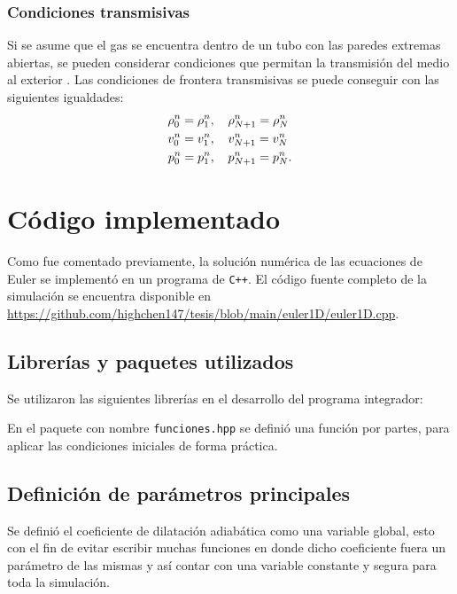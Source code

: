 \subsubsection{Condiciones transmisivas}
Si se asume que el gas se encuentra dentro de un tubo con las paredes extremas abiertas, se pueden considerar condiciones que permitan la transmisión del medio al exterior \cite{thesis-euler-godunov}. Las condiciones de frontera transmisivas se puede conseguir con las siguientes igualdades:
\begin{align}
	\rho_{0}^{n} = \rho_{1}^{n}, \hspace{4mm}&
	\rho_{N+1}^{n} = \rho_{N}^{n} \\
	v_{0}^{n} = v_{1}^{n}, \hspace{4mm}&
	v_{N+1}^{n} = v_{N}^{n} \\
	p_{0}^{n} = p_{1}^{n}, \hspace{4mm}&
	p_{N+1}^{n} = p_{N}^{n}.
\end{align}
\section{Código implementado}
\lstset{inputencoding=utf8/latin1}
Como fue comentado previamente, la solución numérica de las ecuaciones de Euler se implementó en un programa de \texttt{C++}. El código fuente completo de la simulación se encuentra disponible en \url{https://github.com/highchen147/tesis/blob/main/euler1D/euler1D.cpp}.

\subsection{Librerías y paquetes utilizados}
Se utilizaron las siguientes librerías en el desarrollo del programa integrador:


En el paquete con nombre \texttt{funciones.hpp} se definió una función por partes, para aplicar las condiciones iniciales de forma práctica.



\subsection{Definición de parámetros principales}
Se definió el coeficiente de dilatación adiabática como una variable global, esto con el fin de evitar escribir muchas funciones en donde dicho coeficiente fuera un parámetro de las mismas y así contar con una variable constante y segura para toda la simulación.

